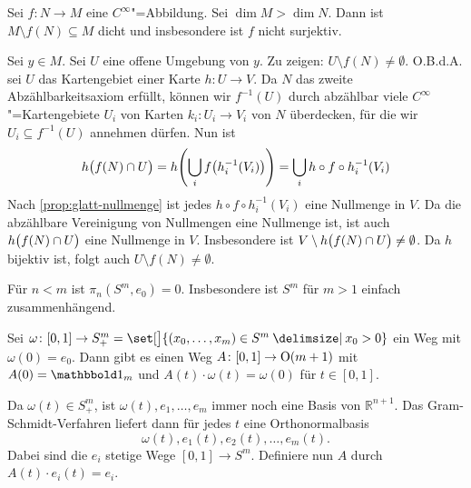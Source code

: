 \begin{korollar}[label=kor:komplement-dicht,{name=[Komplement einer glatten Abbildung in höherdimensionale Mannigfaltigkeit]}]
	Sei $f \colon N \to M$ eine $C^\infty$"=Abbildung. 
	Sei $\dim M > \dim N$. 
	Dann ist $M \setminus f(N) \subseteq M$ dicht und insbesondere ist $f$ nicht surjektiv.
\end{korollar}
\begin{beweis}
	Sei $y \in M$. Sei $U$ eine offene Umgebung von $y$. Zu zeigen: $U \setminus f(N) \neq \emptyset$. 
	O.B.d.A. sei $U$ das Kartengebiet einer Karte $h \colon U \to V$. 
	Da $N$ das zweite Abzählbarkeitsaxiom erfüllt, können wir $f^{-1}(U)$ durch abzählbar viele $C^\infty$"=Kartengebiete $U_i$ von Karten $k_i \colon U_i \to V_i$ von $N$ überdecken, für die wir $U_i \subseteq f ^{-1}(U)$ annehmen dürfen. 
	Nun ist
	\[
		h \enbrace[\big]{f(N) \cap U}  = h \enbrace*{\bigcup_{i} f\enbrace*{h_i ^{-1}(V_i)}} = \bigcup_i h \circ f \circ h_i ^{-1} (V_i)
	\]
	Nach \cref{prop:glatt-nullmenge} ist jedes $h \circ f \circ h_i^{-1}(V_i)$ eine Nullmenge in $V$. 
	Da die abzählbare Vereinigung von Nullmengen eine Nullmenge ist, ist auch $h \enbrace[\big]{f(N) \cap U}$ eine Nullmenge in $V$. 
	Insbesondere ist $V \setminus h \enbrace[\big]{f(N)\cap U} \neq \emptyset$. 
	Da $h$ bijektiv ist, folgt auch $U \setminus f(N) \neq \emptyset$.
\end{beweis}

\begin{satz}[label=satz:sphaere-einf-zsmh,{name=[triviale Homotopiegruppen der Sphäre]}]
	Für $n < m$ ist $\pi_n (S^m,e_0) = 0$. Insbesondere ist $S^m$ für $m>1$ einfach zusammenhängend.
\end{satz}

\begin{lemma}[{name=[Existenz eines Wegen in der Gruppe der orthogonalen Matrizen]},label=lem:weg-orthogonal]
	Sei $\omega \colon [0,1] \to S^m_+ = \set[\big]{(x_0, \ldots , x_m) \in S^m \given x_0 >0}$ ein Weg mit $\omega(0)=e_0$. 
	Dann gibt es einen Weg $A \colon [0,1] \to \On(m+1)$ mit $A(0)=\ind_m$ und $A(t) \cdot \omega(t) = \omega(0)$ für $t \in [0,1]$.
\end{lemma}
\begin{beweis}
	Da $\omega(t) \in S^m_+$, ist $\omega(t), e_1, \ldots ,e_m$ immer noch eine Basis von $\mathbb{R}^{n+1}$. 
	Das Gram-Schmidt-Verfahren liefert dann für jedes $t$ eine Orthonormalbasis 
	\[
		\omega(t), e_1(t), e_2(t), \ldots , e_m(t).
	\]
	Dabei sind die $e_i$ stetige Wege $[0,1] \to S^m$. 
	Definiere nun $A$ durch $A(t) \cdot e_i(t) = e_i$.
\end{beweis}

